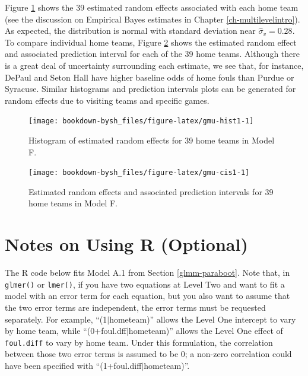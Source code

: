 \documentclass[
]{krantz}
\begin{document}
Figure \ref{fig:gmu-hist1} shows the 39 estimated random effects associated with each home team (see the discussion on Empirical Bayes estimates in Chapter \ref{ch-multilevelintro}). As expected, the distribution is normal with standard deviation near \(\hat{\sigma}_{v}=0.28\). To compare individual home teams, Figure \ref{fig:gmu-cis1} shows the estimated random effect and associated prediction interval for each of the 39 home teams. Although there is a great deal of uncertainty surrounding each estimate, we see that, for instance, DePaul and Seton Hall have higher baseline odds of home fouls than Purdue or Syracuse. Similar histograms and prediction intervals plots can be generated for random effects due to visiting teams and specific games.

\begin{figure}

{\centering \texttt{[image: bookdown-bysh\_files/figure-latex/gmu-hist1-1]} 

}

\caption{Histogram of estimated random effects for 39 home teams in Model F.}\label{fig:gmu-hist1}
\end{figure}

\begin{figure}

{\centering \texttt{[image: bookdown-bysh\_files/figure-latex/gmu-cis1-1]} 

}

\caption{Estimated random effects and associated prediction intervals for 39 home teams in Model F.}\label{fig:gmu-cis1}
\end{figure}

\hypertarget{usingR-glmm}{%
\section{Notes on Using R (Optional)}\label{usingR-glmm}}

The R code below fits Model A.1 from Section \ref{glmm-paraboot}. Note that, in \texttt{glmer()} or \texttt{lmer()}, if you have two equations at Level Two and want to fit a model with an error term for each equation, but you also want to assume that the two error terms are independent, the error terms must be requested separately. For example, ``(1\(|\)hometeam)'' allows the Level One intercept to vary by home team, while ``(0+foul.dff\(|\)hometeam)'' allows the Level One effect of \texttt{foul.diff} to vary by home team. Under this formulation, the correlation between those two error terms is assumed to be 0; a non-zero correlation could have been specified with ``(1+foul.diff\(|\)hometeam)''.
\end{document}
